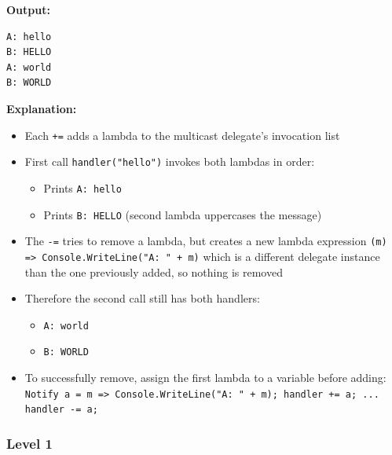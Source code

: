 \textbf{Output:}
\begin{verbatim}
A: hello
B: HELLO
A: world
B: WORLD
\end{verbatim}

\textbf{Explanation:}
\begin{itemize}
    \item Each \texttt{+=} adds a lambda to the multicast delegate's invocation list
    \item First call \texttt{handler("hello")} invokes both lambdas in order:
    \begin{itemize}
        \item Prints \texttt{A: hello}
        \item Prints \texttt{B: HELLO} (second lambda uppercases the message)
    \end{itemize}
    \item The \texttt{-=} tries to remove a lambda, but creates a new lambda expression \texttt{(m) => Console.WriteLine("A: " + m)} which is a different delegate instance than the one previously added, so nothing is removed
    \item Therefore the second call still has both handlers:
    \begin{itemize}
        \item \texttt{A: world}
        \item \texttt{B: WORLD}
    \end{itemize}
    \item To successfully remove, assign the first lambda to a variable before adding: \texttt{Notify a = m => Console.WriteLine("A: " + m); handler += a; ... handler -= a;}
\end{itemize}

\subsubsection{Level 1}

